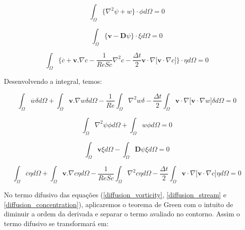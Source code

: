 \begin{equation}
 \int_{\Omega} \big\{ \nabla^2 \psi + w \big\} \cdot \phi d\Omega = 0
\end{equation}

\begin{equation}
 \int_{\Omega} \big\{ \textbf{v} - \textbf{D}\psi \big\} \cdot \xi d\Omega = 0
\end{equation}

\begin{equation}
 \int_{\Omega} \Bigg\{ 
 \overset{.}{c} + \textbf{v}.\nabla c 
 - \frac{1}{\textit{ReSc}} \nabla^2 c 
 - \frac{\Delta t}{2} \textbf{v} \cdot \nabla \big[ \textbf{v} \cdot \nabla c \big]
 \Bigg\} \cdot \eta d\Omega = 0
\end{equation}



\noindent
Desenvolvendo a integral, temos:

\begin{equation} \label{diffusion_vorticity} 
   \int_{\Omega} \overset{.}{w} \delta d\Omega 
 + \int_{\Omega} \textbf{v}.\nabla w \delta d\Omega 
 - \frac{1}{\textit{Re}} \int_{\Omega} \nabla^2 w \delta 
 - \frac{\Delta t}{2} \int_{\Omega} \textbf{v} \cdot \nabla \big[ \textbf{v} \cdot \nabla w \big] \delta d\Omega
 = 0
\end{equation}

\begin{equation} \label{diffusion_stream}
   \int_{\Omega} \nabla^2 \psi \phi d\Omega
 + \int_{\Omega} w \phi d\Omega = 0
\end{equation}

\begin{equation}
   \int_{\Omega} \textbf{v} \xi d\Omega
 - \int_{\Omega} \textbf{D}\psi \xi d\Omega = 0
\end{equation}

\begin{equation} \label{diffusion_concentration} 
   \int_{\Omega} \overset{.}{c} \eta d\Omega
 + \int_{\Omega} \textbf{v}.\nabla c \eta d\Omega
 - \frac{1}{\textit{ReSc}} \int_{\Omega} \nabla^2 c \eta d\Omega 
 - \frac{\Delta t}{2} \int_{\Omega} \textbf{v} \cdot \nabla \big[ \textbf{v} \cdot \nabla c \big] \eta d\Omega
 = 0
\end{equation}

\medskip
No termo difusivo das equações (\ref{diffusion_vorticity}, \ref{diffusion_stream} e \ref{diffusion_concentration}),
aplicaremos o teorema de Green com o intuito de diminuir a ordem
da derivada e separar o termo avaliado no contorno. Assim o termo difusivo se transformará em:

